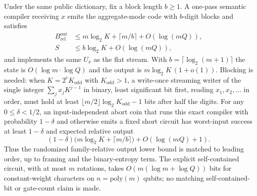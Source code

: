 \begin{proposition}
\label{prop:w1-semantic-upper}
Under the same public dictionary, fix a block length $b\geq1$.  A
one-pass semantic compiler receiving $x$ emits the aggregate-mode code
with $b$-digit blocks and satisfies
\begin{equation}
\begin{aligned}
 B_{\mathrm{rel}}^{\mathrm{out}}
 &\leq m\log_2K+\lceil m/b\rceil+O(\log(mQ)),\\
 S&\leq b\log_2K+O(\log(mQ)),
\end{aligned}
 \label{eq:w1-semantic-upper}
\end{equation}
and implements the same $U_x$ as the flat stream.  With
$b=\lceil\log_2(m+1)\rceil$ the state is
$O(\log m\cdot\log Q)$ and the output is $m\log_2K\,(1+o(1))$.  Blocking is
needed: when $K=2^eK_{\mathrm{odd}}$ with $K_{\mathrm{odd}}>1$, a write-once
streaming writer of the single integer $\sum_jx_jK^{j-1}$ in binary,
least significant bit first, reading $x_1,x_2,\ldots$ in order, must hold
at least $\lfloor m/2\rfloor\log_2K_{\mathrm{odd}}-1$ bits after half the
digits.  For any $0\leq\delta<1/2$, an input-independent abort coin that
runs this exact compiler with probability $1-\delta$ and otherwise emits a
fixed short circuit has worst-input success at least $1-\delta$ and
expected relative output
\begin{equation}
 (1-\delta)\bigl(m\log_2K+\lceil m/b\rceil\bigr)+O(\log(mQ)+1).
 \label{eq:w1-random-upper}
\end{equation}
Thus the randomized family-relative output lower bound is matched to
leading order, up to framing and the binary-entropy term.  The
explicit self-contained circuit, with at most $m$ rotations, takes
$O(m(\log m+\log Q))$ bits for constant-weight characters on
$n=\mathrm{poly}(m)$ qubits; no matching self-contained-bit or gate-count
claim is made.
\end{proposition}

